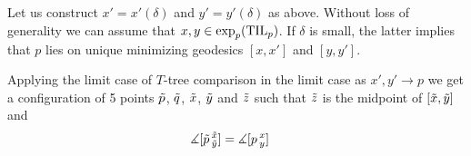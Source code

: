 Let us construct $x'=x'(\delta)$ and $y'=y'(\delta)$ as above.
Without loss of generality we can assume that $x,y\zz\in\exp_p(\TIL_p)$.
If $\delta$ is small, the latter implies that $p$ lies on unique minimizing geodesics $[x,x']$ and $[y,y']$.

Applying the limit case of $T$-tree comparison in the limit case as $x',y'\to p$ we get 
a configuration of 5 points $\~p$, $\~q$, $\~x$, $\~y$ and $\~z$ such that
$\~z$ is the midpoint of $[\~x, \~y]$ and
\begin{align*}
\measuredangle[\~p\,^{\~x}_{\~y}]&=\measuredangle[p\,^x_y]
\end{align*}

\qeds


